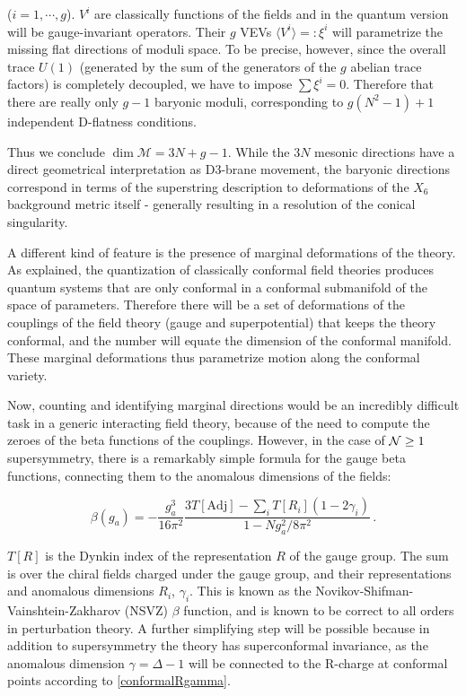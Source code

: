 ($i=1,\cdots,g$). $V^i$ are classically functions of the fields and in the quantum version will be gauge-invariant operators. Their $g$ VEVs $\langle V^i \rangle =: \xi^i$ will parametrize the missing flat directions of moduli space. To be precise, however, since the overall trace $U(1)$ (generated by the sum of the generators of the $g$ abelian trace factors) is completely decoupled, we have to impose $\sum \xi^i = 0$. Therefore that there are really only $g-1$ baryonic moduli, corresponding to $g(N^2-1)+1$ independent D-flatness conditions.

Thus we conclude $\dim \mathcal M = 3N + g - 1$. While the $3N$ mesonic directions have a direct geometrical interpretation as D3-brane movement, the baryonic directions correspond in terms of the superstring description to deformations of the $X_6$ background metric itself - generally resulting in a resolution of the conical singularity.%

A different kind of feature is the presence of marginal deformations of the theory. As explained, the quantization of classically conformal field theories produces quantum systems that are only conformal in a conformal submanifold of the space of parameters. Therefore there will be a set of deformations of the couplings of the field theory (gauge and superpotential) that keeps the theory conformal, and the number will equate the dimension of the conformal manifold. These marginal deformations thus parametrize motion along the conformal variety. 

Now, counting and identifying marginal directions would be an incredibly difficult task in a generic interacting field theory, because of the need to compute the zeroes of the beta functions of the couplings. However, in the case of $\mathcal{N} \geq 1$ supersymmetry, there is a remarkably simple formula for the gauge beta functions, connecting them to the anomalous dimensions of the fields:

\begin{equation}
	\beta(g_a) = - \frac{g_a^3}{16\pi^2} \frac{3 T[\mathrm{Adj}] - \sum_i T[R_i] (1- 2\gamma_i) }{1-Ng_a^2 / 8\pi^2 }\,.
	\label{nszv}
\end{equation}

$T[R]$ is the Dynkin index of the representation $R$ of the gauge group. The sum is over the chiral fields charged under the gauge group, and their representations and anomalous dimensions $R_i$, $\gamma_i$. This is known as the Novikov-Shifman-Vainshtein-Zakharov (NSVZ) $\beta$ function, and is known to be correct to all orders in perturbation theory\cite{Carlino:1999tc}. A further simplifying step will be possible because in addition to supersymmetry the theory has superconformal invariance, as the anomalous dimension $\gamma = \Delta - 1$ will be connected to the R-charge at conformal points according to \eqref{conformalRgamma}.

